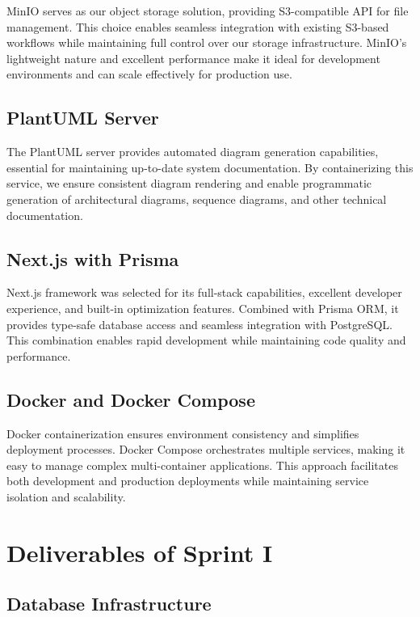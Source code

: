 MinIO serves as our object storage solution, providing S3-compatible API for file management. This choice enables seamless integration with existing S3-based workflows while maintaining full control over our storage infrastructure. MinIO's lightweight nature and excellent performance make it ideal for development environments and can scale effectively for production use.

\subsection{PlantUML Server}

The PlantUML server provides automated diagram generation capabilities, essential for maintaining up-to-date system documentation. By containerizing this service, we ensure consistent diagram rendering and enable programmatic generation of architectural diagrams, sequence diagrams, and other technical documentation.

\subsection{Next.js with Prisma}

Next.js framework was selected for its full-stack capabilities, excellent developer experience, and built-in optimization features. Combined with Prisma ORM, it provides type-safe database access and seamless integration with PostgreSQL. This combination enables rapid development while maintaining code quality and performance.

\subsection{Docker and Docker Compose}

Docker containerization ensures environment consistency and simplifies deployment processes. Docker Compose orchestrates multiple services, making it easy to manage complex multi-container applications. This approach facilitates both development and production deployments while maintaining service isolation and scalability.

\section{Deliverables of Sprint I}

\subsection{Database Infrastructure}

